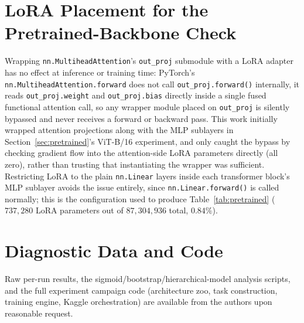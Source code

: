 \documentclass[11pt]{article}
\begin{document}
\section{LoRA Placement for the Pretrained-Backbone Check}
\label{app:lorafix}
Wrapping \texttt{nn.MultiheadAttention}'s \texttt{out\_proj} submodule with
a LoRA adapter has no effect at inference or training time: PyTorch's
\texttt{nn.MultiheadAttention.forward} does not call
\texttt{out\_proj.forward()} internally, it reads \texttt{out\_proj.weight}
and \texttt{out\_proj.bias} directly inside a single fused functional
attention call, so any wrapper module placed on \texttt{out\_proj} is
silently bypassed and never receives a forward or backward pass. This work
initially wrapped attention projections along with the MLP sublayers
in Section~\ref{sec:pretrained}'s ViT-B/16 experiment, and only caught the
bypass by checking gradient flow into the attention-side LoRA parameters
directly (all zero), rather than trusting that instantiating the wrapper
was sufficient. Restricting LoRA to the plain \texttt{nn.Linear} layers
inside each transformer block's MLP sublayer avoids the issue entirely,
since \texttt{nn.Linear.forward()} is called normally; this is the
configuration used to produce Table~\ref{tab:pretrained} ($737{,}280$ LoRA
parameters out of $87{,}304{,}936$ total, $0.84\%$).

\section{Diagnostic Data and Code}
\label{app:diagnostic}
Raw per-run results, the sigmoid/bootstrap/hierarchical-model analysis
scripts, and the full experiment campaign code (architecture zoo, task
construction, training engine, Kaggle orchestration) are available from the
authors upon reasonable request.
\end{document}
